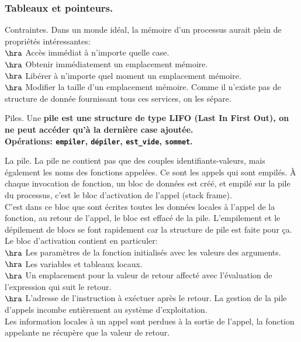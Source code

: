 \documentclass[french, 11pt]{article}
\begin{document}
\subsubsection{Tableaux et pointeurs.}

\begin{defi}{Contraintes.}{}
    Dans un monde idéal, la mémoire d'un processus aurait plein de propriétés intéressantes:\\
    $\hra$ Accès immédiat à n'importe quelle case.\\
    $\hra$ Obtenir immédiatement un emplacement mémoire.\\
    $\hra$ Libérer à n'importe quel moment un emplacement mémoire.\\
    $\hra$ Modifier la taille d'un emplacement mémoire.\n
    Comme il n'existe pas de structure de donnée fournissant tous ces services, on les sépare.
\end{defi}

\begin{defi}{Piles.}{}
    Une \bf{pile} est une structure de type LIFO (Last In First Out), on ne peut accéder qu'à la dernière case ajoutée.\\
    \bf{Opérations:} \texttt{empiler}, \texttt{dépiler}, \texttt{est\_vide}, \texttt{sommet}.
\end{defi}

\pagebreak

\begin{defi}{La pile.}{}
    La pile ne contient pas que des couples identifiants-valeurs, mais également les noms des fonctions appelées. Ce sont les appels qui sont empilés.\n
    À chaque invocation de fonction, un bloc de données est créé, et empilé sur la pile du processus, c'est le bloc d'activation de l'appel (stack frame).\\
    C'est dans ce bloc que sont écrites toutes les données locales à l'appel de la fonction, au retour de l'appel, le bloc est effacé de la pile. L'empilement et le dépilement de blocs se font rapidement car la structure de pile est faite pour ça.\n
    Le bloc d'activation contient en particuler:\\
    $\hra$ Les paramètres de la fonction initialisés avec les valeurs des arguments.\\
    $\hra$ Les variables et tableaux locaux.\\
    $\hra$ Un emplacement pour la valeur de retour affecté avec l'évaluation de l'expression qui suit le retour.\\
    $\hra$ L'adresse de l'instruction à exéctuer après le retour.\n
    La gestion de la pile d'appels incombe entièrement au système d'exploitation.\\
    Les information locales à un appel sont perdues à la sortie de l'appel, la fonction appelante ne récupère que la valeur de retour.
\end{defi}
\end{document}
